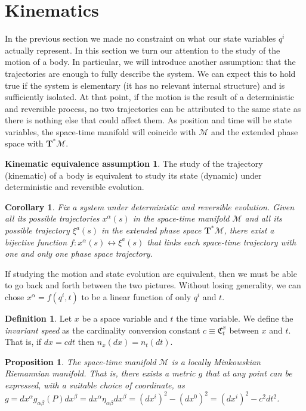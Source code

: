 \documentclass[aps,pra,10pt,twocolumn,floatfix,nofootinbib]{revtex4-1}
\newtheorem{cor}[thm]{Corollary}
\newtheorem{prop}[thm]{Proposition}
\theoremstyle{definition}
\newtheorem{defn}[thm]{Definition}
\newtheorem*{assump3}{Kinematic equivalence assumption}
\begin{document}
\section{Kinematics}
In the previous section we made no constraint on what our state variables $q^i$ actually represent. In this section we turn our attention to the study of the motion of a body. In particular, we will introduce another assumption: that the trajectories are enough to fully describe the system. We can expect this to hold true if the system is elementary (it has no relevant internal structure) and is sufficiently isolated. At that point, if the motion is the result of a deterministic and reversible process, no two trajectories can be attributed to the same state as there is nothing else that could affect them. As position and time will be state variables, the space-time manifold will coincide with $\mathcal{M}$ and the extended phase space with $\mathbf{T}^*\mathcal{M}$.

\begin{assump3}\label{kinematicAssumption}
The study of the trajectory (kinematic) of a body is equivalent to study its state (dynamic) under deterministic and reversible evolution.
\end{assump3}

\begin{cor}\label{singleTrajectory}
Fix a system under deterministic and reversible evolution. Given all its possible trajectories $x^\alpha(s)$ in the space-time manifold $\mathcal{M}$ and all its possible trajectory $\xi^a(s)$ in the extended phase space $\mathbf{T}^*\mathcal{M}$, there exist a bijective function $f: x^\alpha(s) \leftrightarrow \xi^a(s)$ that links each space-time trajectory with one and only one phase space trajectory.
\end{cor}

If studying the motion and state evolution are equivalent, then we must be able to go back and forth between the two pictures. Without losing generality, we can chose $x^\alpha=f(q^i,t)$ to be a linear function of only $q^i$ and $t$.

\begin{defn}\label{invariantSpeed}
Let $x$ be a space variable and $t$ the time variable. We define the \emph{invariant speed} as the cardinality conversion constant $c \equiv \mathfrak{C}^x_t$ between $x$ and $t$. That is, if $dx=cdt$ then $n_x(dx)=n_t(dt)$.
\end{defn}

\begin{prop}\label{locallyMinkowski}
The space-time manifold $\mathcal{M}$ is a locally Minkowskian Riemannian manifold. That is, there exists a metric $g$ that at any point can be expressed, with a suitable choice of coordinate, as $g=dx^\alpha g_{\alpha \beta}(P) dx^\beta=dx^\alpha\eta_{\alpha \beta}dx^\beta=(dx^i)^2 - (dx^0)^2=(dx^i)^2 - c^2dt^2$.
\end{prop}
\end{document}
